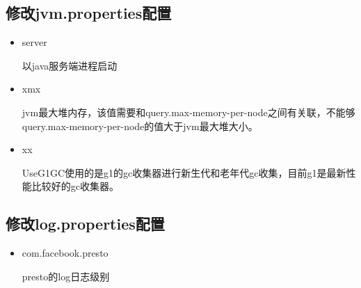 \documentclass[letterpaper,10pt,english]{sphinxmanual}
\begin{document}
\subsection{修改jvm.properties配置}
\label{\detokenize{installation/cluster:jvm-properties}}
\begin{sphinxVerbatim}[commandchars=\\\{\}]
\end{sphinxVerbatim}
\begin{itemize}
\item {} 
server

以java服务端进程启动

\item {} 
xmx

jvm最大堆内存，该值需要和query.max-memory-per-node之间有关联，不能够query.max-memory-per-node的值大于jvm最大堆大小。

\end{itemize}

\begin{sphinxVerbatim}[commandchars=\\\{\}]
  
  
\end{sphinxVerbatim}
\begin{itemize}
\item {} 
xx

UseG1GC使用的是g1的gc收集器进行新生代和老年代gc收集，目前g1是最新性能比较好的gc收集器。

\end{itemize}


\subsection{修改log.properties配置}
\label{\detokenize{installation/cluster:log-properties}}
\begin{sphinxVerbatim}[commandchars=\\\{\}]
\end{sphinxVerbatim}
\begin{itemize}
\item {} 
com.facebook.presto

presto的log日志级别

\end{itemize}
\end{document}
